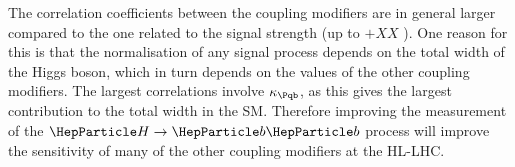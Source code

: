 


The correlation coefficients between the coupling modifiers are in general larger compared to the one related to the signal strength (up to $+XX$ ). One reason for this is that the normalisation of any signal process depends on the total width of the Higgs boson, which in turn depends on the values of the other coupling modifiers. The largest correlations involve $\kb$, as this gives the largest contribution to the total width in the SM. Therefore improving the measurement of the $\hbb$ process will improve the sensitivity of many of the other coupling modifiers at the HL-LHC.



